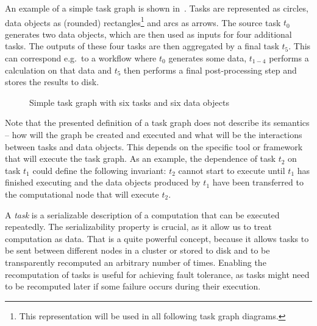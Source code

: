 An example of a simple task graph is shown in~. Tasks are represented as
circles, data objects as (rounded) rectangles\footnote{This representation will be used in all following task graph diagrams.} and arcs as arrows. The source
task $t_0$ generates two data objects, which are then used as inputs for four
additional tasks. The outputs of these four tasks are then aggregated by a final task
$t_5$. This can correspond e.g.\ to a workflow where $t_0$
generates some data, $t_{1-4}$ performs a calculation on that data and
$t_5$ then performs a final post-processing step and stores the results to disk.

\begin{figure}[h]
	\centering
	\caption{Simple task graph with six tasks and six data objects}
	\label{fig:task-graph-example}
\end{figure}

Note that the presented definition of a task graph does not describe its semantics -- how will the
graph be created and executed and what will be the interactions between tasks and data objects.
This depends on the specific tool or framework that will execute the task graph. As an example, the
dependence of task $t_2$ on task $t_1$ could define the following
invariant: $t_2$ cannot start to execute until $t_1$ has finished
executing and the data objects produced by $t_1$ have been transferred to the
computational node that will execute $t_2$.

A \emph{task} is a serializable description of a computation that can be executed
repeatedly. The serializability property is crucial, as it allow us to treat computation as data.
That is a quite powerful concept, because it allows tasks to be sent between different nodes in a
cluster or stored to disk and to be transparently recomputed an arbitrary number of times. Enabling
the recomputation of tasks is useful for achieving fault tolerance, as tasks might need to be
recomputed later if some failure occurs during their execution.

